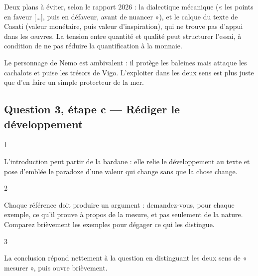 \documentclass[11pt,a4paper]{article}
\begin{document}
\begin{piege}

Deux plans à éviter, selon le rapport 2026 : la dialectique mécanique (« les points en faveur {[}\ldots{]}, puis en défaveur, avant de nuancer »), et le calque du texte de Casati (valeur monétaire, puis valeur d'inspiration), qui ne trouve pas d'appui dans les œuvres. La tension entre quantité et qualité peut structurer l'essai, à condition de ne pas réduire la quantification à la monnaie.

\end{piege}

\begin{piege}

Le personnage de Nemo est ambivalent : il protège les baleines mais attaque les cachalots et puise les trésors de Vigo. L'exploiter dans les deux sens est plus juste que d'en faire un simple protecteur de la mer.

\end{piege}

\hypertarget{question-3-uxe9tape-c-ruxe9diger-le-duxe9veloppement}{%
\subsection{Question 3, étape c --- Rédiger le développement}\label{question-3-uxe9tape-c-ruxe9diger-le-duxe9veloppement}}

\begin{indication}{1}

L'introduction peut partir de la bardane : elle relie le développement au texte et pose d'emblée le paradoxe d'une valeur qui change sans que la chose change.

\end{indication}

\begin{indication}{2}

Chaque référence doit produire un argument : demandez-vous, pour chaque exemple, ce qu'il prouve à propos de la mesure, et pas seulement de la nature. Comparez brièvement les exemples pour dégager ce qui les distingue.

\end{indication}

\begin{indication}{3}

La conclusion répond nettement à la question en distinguant les deux sens de « mesurer », puis ouvre brièvement.

\end{indication}
\end{document}
